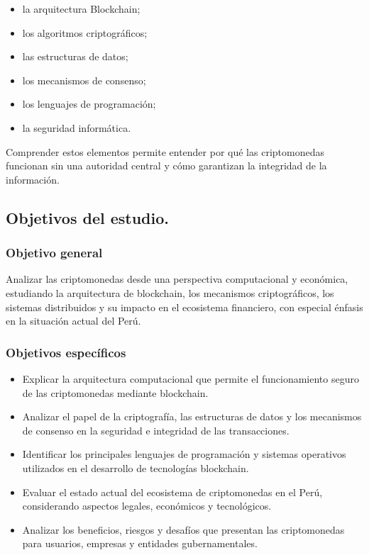 \documentclass[12pt,a4paper]{article}
\begin{document}
\begin{itemize}
  \item la arquitectura Blockchain;
  \item los algoritmos criptográficos;
  \item las estructuras de datos;
  \item los mecanismos de consenso;
  \item los lenguajes de programación;
  \item la seguridad informática.
\end{itemize}

Comprender estos elementos permite entender por qué las criptomonedas funcionan sin
una autoridad central y cómo garantizan la integridad de la información.

\subsection{Objetivos del estudio.}

\subsubsection*{Objetivo general}

Analizar las criptomonedas desde una perspectiva computacional y económica, estudiando
la arquitectura de blockchain, los mecanismos criptográficos, los sistemas distribuidos y su
impacto en el ecosistema financiero, con especial énfasis en la situación actual del Perú.

\subsubsection*{Objetivos específicos}

\begin{itemize}
  \item Explicar la arquitectura computacional que permite el funcionamiento seguro de las
        criptomonedas mediante blockchain.
  \item Analizar el papel de la criptografía, las estructuras de datos y los mecanismos de
        consenso en la seguridad e integridad de las transacciones.
  \item Identificar los principales lenguajes de programación y sistemas operativos utilizados
        en el desarrollo de tecnologías blockchain.
  \item Evaluar el estado actual del ecosistema de criptomonedas en el Perú, considerando
        aspectos legales, económicos y tecnológicos.
  \item Analizar los beneficios, riesgos y desafíos que presentan las criptomonedas para
        usuarios, empresas y entidades gubernamentales.
\end{itemize}
\end{document}
